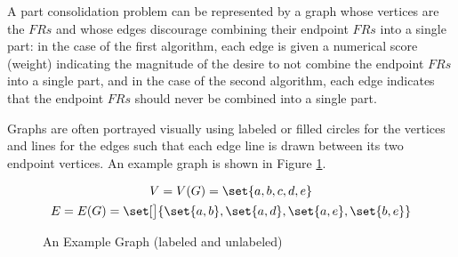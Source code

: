 A part consolidation problem can be represented by a graph whose vertices are the \(FRs\) and whose edges
discourage combining their endpoint \(FRs\) into a single part: in the case of the first algorithm, each edge is
given a numerical score (weight) indicating the magnitude of the desire to not combine the endpoint \(FRs\) into a
single part, and in the case of the second algorithm, each edge indicates that the endpoint \(FRs\) should never be
combined into a single part.

Graphs are often portrayed visually using labeled or filled circles for the vertices and lines for the edges such
that each edge line is drawn between its two endpoint vertices.  An example graph is shown in Figure
\ref{fig:exgraph}.

\begin{figure}[h]
  \label{fig:exgraph}
  \begin{minipage}{3in}
    \vspace{0in}
    \begin{center}
    \end{center}
  \end{minipage}
  \begin{minipage}{3in}
    \vspace{0in}
    \begin{center}
    \end{center}
  \end{minipage}
  \begin{gather*}
    V=V(G)=\set{a,b,c,d,e} \\
    E=E(G)=\set[\big]{\set{a,b},\set{a,d},\set{a,e},\set{b,e}}
  \end{gather*}
  \caption{An Example Graph (labeled and unlabeled)}
\end{figure}

